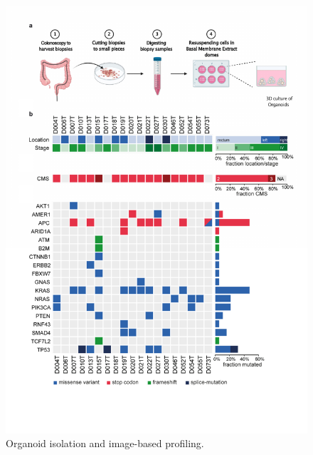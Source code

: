 \begin{flushleft}
\begin{figure}[h]
\centering
\includegraphics[width=\textwidth,
                height=\textheight,
                keepaspectratio]{figures/thesis_organoid_overview.pdf}
\caption{Organoid isolation and image-based profiling.}
\label{colon_cancer_progression}
\end{figure}


\end{flushleft}
